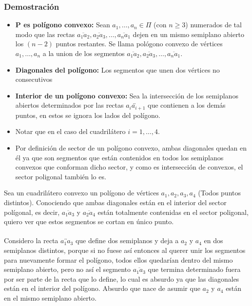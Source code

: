 \documentclass[a4paper]{article}
\begin{document}
\subsubsection{Demostración}
\begin{itemize}
    \item \textbf{P es polígono convexo:} Sean $a_1,\dots, a_n \in \Pi$ (con $n\geq 3$) numerados de tal modo que las rectas $\overline{a_1a_2}, \overline{a_2a_3}, \dots, \overline{a_na_1}$ dejen en un mismo semiplano abierto los $(n-2)$ puntos restantes. Se llama pológono convexo de vértices $a_1,\dots,a_n$ a la union de los segmentos $\overline{a_1a_2}, \overline{a_2a_3}, \dots, \overline{a_na_1}$.
    \item \textbf{Diagonales del polígono:} Los segmentos que unen dos vértices no consecutivos
    \item \textbf{Interior de un polígono convexo:} Sea la intersección de los semiplanos abiertos determinados por las rectas $\overleftrightarrow{a_ia_{i+1}}$ que contienen a los demás puntos, en estos se ignora los lados del polígono.
    \item Notar que en el caso del cuadrilátero $i=1,\dots,4$.
    \item Por definición de sector de un polígono convexo, ambas diagonales quedan en él ya que son segmentos que están contenidos en todos los semiplanos convexos que conforman dicho sector, y como es intersección de convexos, el sector poligonal también lo es.
\end{itemize}
Sea un cuadrilátero convexo un polígono de vértices $a_1, a_2, a_3, a_4$ (Todos puntos distintos). Conociendo que ambas diagonales están en el interior del sector polígonal, es decir, $\overline{a_1a_3}$ y $\overline{a_2a_4}$ están totalmente contenidas en el sector poligonal, quiero ver que estos segmentos se cortan en único punto.\\\\
Considero la recta $\overleftrightarrow{a_1a_3}$ que define dos semiplanos y deja a $a_2$ y $a_4$ en dos semiplanos distintos, porque si no fuese así entonces al querer unir los segmentos para nuevamente formar el polígono, todos ellos quedarían dentro del mismo semiplano abierto, pero no así el segmento $\overline{a_1a_3}$ que termina determinado fuera por ser parte de la recta que lo define, lo cual es absurdo ya que las diagonales están en el interior del polígono. Absurdo que nace de asumir que $a_2$ y $a_4$ están en el mismo semiplano abierto. \\\\
\end{document}
